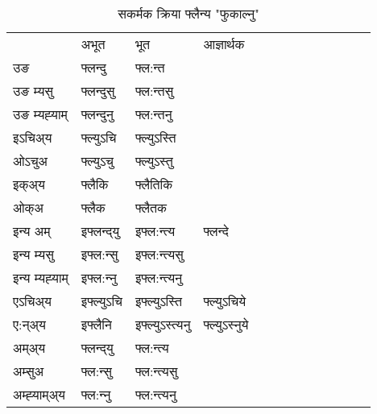 \begin{table}[H]
\label{unt.vt} \centering
\caption{सकर्मक क्रिया  फ्लैन्य  "फुकाल्नु"  }
\begin{tabular}{l|l|l|l|l|l|l|l|l|l|l|l|l}  \toprule
&अभूत & भूत & आज्ञार्थक \\ 
उङ &फ्लन्दु &फ्ल:न्त \\ 
उङ म्यसु &फ्लन्दुसु &फ्ल:न्तसु \\ 
उङ म्यह्‍याम् &फ्लन्दुनु &फ्ल:न्तनु \\ 
इऽचिअ्य &फ्ल्युऽचि &फ्ल्युऽस्ति   \\ 
ओऽचुअ &फ्ल्युऽचु &फ्ल्युऽस्तु   \\ 
इक्अ्य &फ्लैकि &फ्लैतिकि   \\ 
ओक्अ &फ्लैक &फ्लैतक   \\ 
इन्य अम् & इफ्लन्द्‌यु  & इफ्ल:न्त्य &फ्लन्दे  \\ 
इन्य म्यसु & इफ्ल:न्सु  & इफ्ल:न्त्यसु   \\ 
इन्य म्यह्‍याम् & इफ्ल:न्‍नु  & इफ्ल:न्त्यनु   \\ 
एऽचिअ्य & इफ्ल्युऽचि & इफ्ल्युऽस्ति &फ्ल्युऽचिये    \\ 
ए:न्अ्य & इफ्लैनि  & इफ्ल्युऽस्त्यनु &फ्ल्युऽस्‍नुये  \\ 
अम्अ्य & फ्लन्द्‌यु  & फ्ल:न्त्य  \\ 
अम्सुअ & फ्ल:न्सु & फ्ल:न्त्यसु  \\ 
अम्ह्‍याम्अ्य & फ्ल:न्‍नु  & फ्ल:न्त्यनु \\ 
\bottomrule
\end{tabular}
\end{table}


